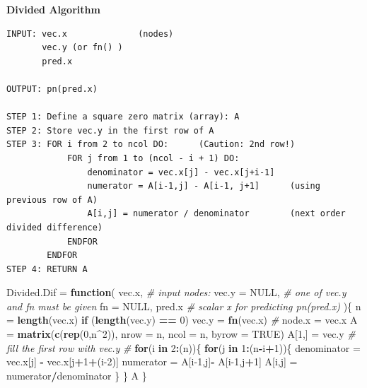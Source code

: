 \documentclass[
]{book}
\newenvironment{Shaded}{\begin{snugshade}}{\end{snugshade}}
\newcommand{\AttributeTok}[1]{\textcolor[rgb]{0.13,0.29,0.53}{#1}}
\newcommand{\CommentTok}[1]{\textcolor[rgb]{0.56,0.35,0.01}{\textit{#1}}}
\newcommand{\ConstantTok}[1]{\textcolor[rgb]{0.56,0.35,0.01}{#1}}
\newcommand{\ControlFlowTok}[1]{\textcolor[rgb]{0.13,0.29,0.53}{\textbf{#1}}}
\newcommand{\DecValTok}[1]{\textcolor[rgb]{0.00,0.00,0.81}{#1}}
\newcommand{\FunctionTok}[1]{\textcolor[rgb]{0.13,0.29,0.53}{\textbf{#1}}}
\newcommand{\NormalTok}[1]{#1}
\newcommand{\OtherTok}[1]{\textcolor[rgb]{0.56,0.35,0.01}{#1}}
\newcommand{\SpecialCharTok}[1]{\textcolor[rgb]{0.81,0.36,0.00}{\textbf{#1}}}
\begin{document}
\textbf{Divided Algorithm}

\begin{verbatim}
INPUT: vec.x              (nodes)
       vec.y (or fn() )
       pred.x
       
OUTPUT: pn(pred.x)

STEP 1: Define a square zero matrix (array): A
STEP 2: Store vec.y in the first row of A
STEP 3: FOR i from 2 to ncol DO:      (Caution: 2nd row!)
            FOR j from 1 to (ncol - i + 1) DO:
                denominator = vec.x[j] - vec.x[j+i-1]
                numerator = A[i-1,j] - A[i-1, j+1]      (using previous row of A)
                A[i,j] = numerator / denominator        (next order divided difference)
            ENDFOR
        ENDFOR
STEP 4: RETURN A
\end{verbatim}

\begin{Shaded}
\begin{Highlighting}[]
\NormalTok{Divided.Dif }\OtherTok{=} \ControlFlowTok{function}\NormalTok{(}
\NormalTok{        vec.x,          }\CommentTok{\# input nodes:}
        \AttributeTok{vec.y =} \ConstantTok{NULL}\NormalTok{,   }\CommentTok{\# one of vec.y and fn must be given}
        \AttributeTok{fn =} \ConstantTok{NULL}\NormalTok{,}
\NormalTok{        pred.x          }\CommentTok{\# scalar x for predicting pn(pred.x)}
\NormalTok{         )\{}
\NormalTok{   n }\OtherTok{=} \FunctionTok{length}\NormalTok{(vec.x)}
   \ControlFlowTok{if}\NormalTok{ (}\FunctionTok{length}\NormalTok{(vec.y) }\SpecialCharTok{==} \DecValTok{0}\NormalTok{) vec.y }\OtherTok{=} \FunctionTok{fn}\NormalTok{(vec.x) }\CommentTok{\#}
\NormalTok{   node.x }\OtherTok{=}\NormalTok{ vec.x}
\NormalTok{   A }\OtherTok{=} \FunctionTok{matrix}\NormalTok{(}\FunctionTok{c}\NormalTok{(}\FunctionTok{rep}\NormalTok{(}\DecValTok{0}\NormalTok{,n}\SpecialCharTok{\^{}}\DecValTok{2}\NormalTok{)), }\AttributeTok{nrow =}\NormalTok{ n, }\AttributeTok{ncol =}\NormalTok{ n, }\AttributeTok{byrow =} \ConstantTok{TRUE}\NormalTok{)}
\NormalTok{   A[}\DecValTok{1}\NormalTok{,] }\OtherTok{=}\NormalTok{ vec.y     }\CommentTok{\# fill the first row with vec.y}
   \CommentTok{\#}
   \ControlFlowTok{for}\NormalTok{(i }\ControlFlowTok{in} \DecValTok{2}\SpecialCharTok{:}\NormalTok{(n))\{}
     \ControlFlowTok{for}\NormalTok{(j }\ControlFlowTok{in} \DecValTok{1}\SpecialCharTok{:}\NormalTok{(n}\SpecialCharTok{{-}}\NormalTok{i}\SpecialCharTok{+}\DecValTok{1}\NormalTok{))\{}
\NormalTok{      denominator }\OtherTok{=}\NormalTok{ vec.x[j] }\SpecialCharTok{{-}}\NormalTok{ vec.x[j}\SpecialCharTok{+}\DecValTok{1}\SpecialCharTok{+}\NormalTok{(i}\DecValTok{{-}2}\NormalTok{)]}
\NormalTok{      numerator }\OtherTok{=}\NormalTok{ A[i}\DecValTok{{-}1}\NormalTok{,j]}\SpecialCharTok{{-}}\NormalTok{ A[i}\DecValTok{{-}1}\NormalTok{,j}\SpecialCharTok{+}\DecValTok{1}\NormalTok{]}
\NormalTok{      A[i,j] }\OtherTok{=}\NormalTok{ numerator}\SpecialCharTok{/}\NormalTok{denominator}
\NormalTok{      \}}
\NormalTok{    \}}
\NormalTok{  A}
\NormalTok{ \}}
\end{Highlighting}
\end{Shaded}
\end{document}
